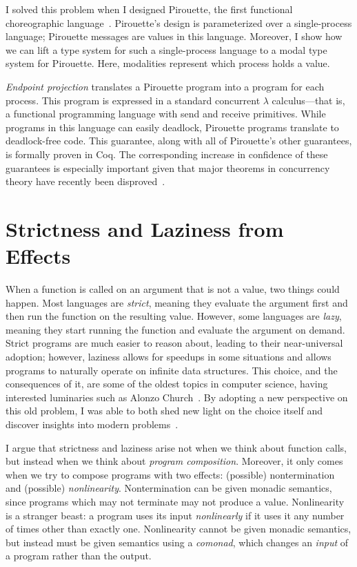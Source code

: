 \documentclass{article}
\theoremstyle{definition}
\begin{document}
I solved this problem when I designed Pirouette, the first functional choreographic language~\citep{HirschG22}.
Pirouette's design is parameterized over a single-process language; Pirouette messages are values in this language.
Moreover, I show how we can lift a type system for such a single-process language to a modal type system for Pirouette.
Here, modalities represent which process holds a value.

\emph{Endpoint projection} translates a Pirouette program into a program for each process.
This program is expressed in a standard concurrent $\lambda$ calculus---that is, a functional programming language with \textsf{send} and \textsf{receive} primitives.
While programs in this language can easily deadlock, Pirouette programs translate to deadlock-free code.
This guarantee, along with all of Pirouette's other guarantees, is formally proven in Coq.
The corresponding increase in confidence of these guarantees is especially important given that major theorems in concurrency theory have recently been disproved~\citep{Cruz-FilipeMP19}.

\iffalse
\section*{Strictness and Laziness from Effects}

When a function is called on an argument that is not a value, two things could happen.
Most languages are \emph{strict}, meaning they evaluate the argument first and then run the function on the resulting value.
However, some languages are \emph{lazy}, meaning they start running the function and evaluate the argument on demand.
Strict programs are much easier to reason about, leading to their near-universal adoption; however, laziness allows for speedups in some situations and allows programs to naturally operate on infinite data structures.
This choice, and the consequences of it, are some of the oldest topics in computer science, having interested luminaries such as Alonzo Church~\citep{ChurchR36}.
By adopting a new perspective on this old problem, I was able to both shed new light on the choice itself and discover insights into modern problems~\citep{HirschT18}.

I argue that strictness and laziness arise not when we think about function calls, but instead when we think about \emph{program composition}.
Moreover, it only comes when we try to compose programs with two effects: (possible) nontermination and (possible) \emph{nonlinearity}.
Nontermination can be given monadic semantics, since programs which may not terminate may not produce a value.
Nonlinearity is a stranger beast: a program uses its input \emph{nonlinearly} if it uses it any number of times other than exactly one.
Nonlinearity cannot be given monadic semantics, but instead must be given semantics using a \emph{comonad}, which changes an \emph{input} of a program rather than the output.
\end{document}
